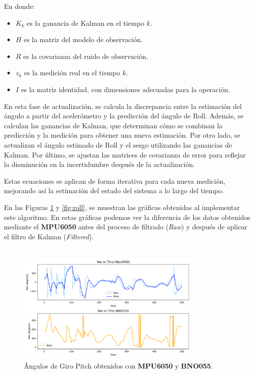         En donde:
        \begin{itemize}
            \item $K_k$ es la ganancia de Kalman en el tiempo $k$.
            \item $H$ es la matriz del modelo de observación.
            \item $R$ es la covarianza del ruido de observación.
            \item $z_k$ es la medición real en el tiempo $k$.
            \item $I$ es la matriz identidad, con dimensiones adecuadas para la operación.
        \end{itemize}

        En esta fase de actualización, se calcula la discrepancia entre la estimación del ángulo a partir del acelerómetro y la predicción del ángulo de Roll. Además, se calculan las ganancias de Kalman, que determinan cómo se combinan la predicción y la medición para obtener una nueva estimación. Por otro lado, se actualizan el ángulo estimado de Roll y el sesgo utilizando las ganancias de Kalman. Por último, se ajustan las matrices de covarianza de error para reflejar la disminución en la incertidumbre después de la actualización. 

        Estas ecuaciones se aplican de forma iterativa para cada nueva medición, mejorando así la estimación del estado del sistema a lo largo del tiempo. 

        En las Figuras  \ref{fig:pitch} y \ref{fig:roll}, se muestran las gráficas obtenidas al implementar este algoritmo. En estas gráficas podemos ver la diferencia de los datos obtenidos mediante el \textbf{MPU6050} antes del proceso de filtrado (\textit{Raw}) y después de aplicar el filtro de Kalman (\textit{Filtered}).
        \\ \\
        \begin{figure}[H]
            \centering
            \includegraphics[width=0.8\textwidth]{Imagenes/Metodologia/Angulos_Giro_pitch_Mpu6050_BNO055.png}
            \caption{Ángulos de Giro Pitch obtenidos con \textbf{MPU6050} y \textbf{BNO055}.}
            \label{fig:pitch}
        \end{figure}

